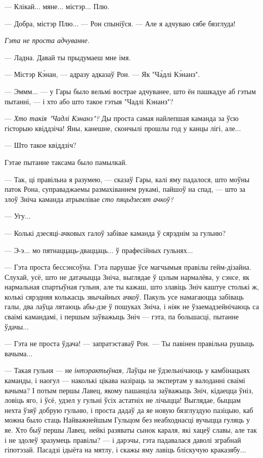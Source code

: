 --- Клікай... мяне... містэр... Плю. 

--- Добра, містэр Плю... --- Рон спыніўся. --- Але я адчуваю сябе бязглуда!

\emph{Гэта не проста адчуванне.}

--- Ладна. Давай ты прыдумаеш мне імя.

--- Містэр К\'энан, --- адразу адказаў Рон. --- Як "Ч\'адлі К\'энанз".

--- Эммм... --- у Гары было вельмі вострае адчуванее, што ён пашкадуе аб гэтым
пытанні, --- і хто або што такое гэтыя "Чадлі Кэнанз"?

--- \emph{Хто такія "Чадлі Кэнанз"?} Ды проста самая найлепшая каманда за ўсю гісторыю 
квіддзіча! Яны, канешне, скончылі прошлы год у канцы лігі, але...

--- Што такое квіддзіч?

Гэтае пытанне таксама было памылкай.

--- Так, ці правільна я разумею, --- сказаў Гары, калі яму падалося, што моўны паток
Рона, суправаджаемы размахіваннем рукамі, пайшоў на спад, --- што за злоў Зніча
каманда атрымлівае \emph{сто пяцьдзесят ачкоў?}

--- Угу...

--- Колькі дзесяці-ачковых галоў забівае каманда ў сярэднім за гульню?

--- Э-э... мо пятнаццаць-дваццаць... ў прафесійных гульнях...

--- Гэта проста бессэнсоўна. Гэта парушае ўсе магчымыя правілы гейм-дізайна.
Слухай, усё, што не датачыцца Зніча, выглядае ў цэлым нармалёва, у сэнсе, 
як нармальная спартыўная гульня, але ты кажаш, што злавіць Зніч
каштуе столькі ж, колькі сярэдняя колькасць звычайных ачкоў. Пакуль усе 
намагаюцца забіваць галы, два лаўца лятаюць абы-дзе ў пошуках Зніча, і 
\emph{ніяк} не ўзаемадзейнічаюць са сваімі камандамі, і першым заўважыць 
Зніч --- гэта, па большасці, пытанне ўдачы...

--- Гэта не проста ўдача! --- запратэставаў Рон. --- Ты павінен 
правільна рушыць вачыма...

--- Такая гульня --- не \emph{інтэрактыўная,} Лаўцы не ўдзельнічаюць у камбінацыях
каманды, і наогул --- наколькі цікава назіраць за экспертам у валоданні сваімі 
вачыма? І потым першы Лавец, якому пашанціла заўважыць Зніч, кідаецца ўніз, 
ловіць яго, і ўсё, удзел у гульні ўсіх астатніх не лічыцца! Выглядае, быццам
нехта ўзяў добрую гульню, і проста дадаў да яе новую бязглуздую пазіцыю, каб 
можна было стаць Найважнейшым Гульцом без неабходнасці вучыцца гуляць у яе.
Хто быў першы Лавец, нейкі разяваты сынок караля, які хацеў славы, але так і 
не здолеў зразумець правілы? --- і дарэчы, гэта падавалася даволі зграбнай
гіпотэзай. Пасадзі ідыёта на мятлу, і скажы яму лавіць бліскучую краказябу...  

